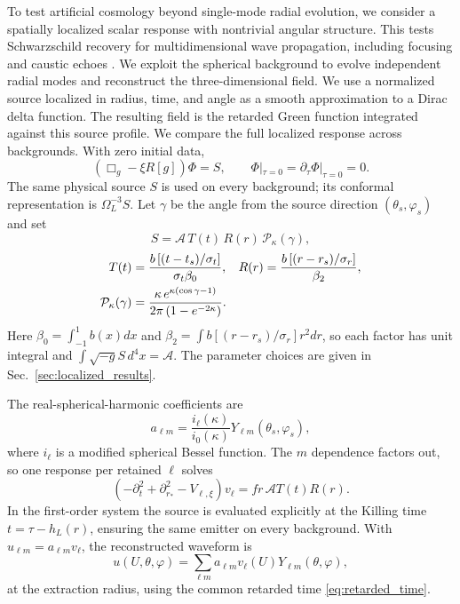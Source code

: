 \documentclass[
 aps,
 prd,
 reprint,
 superscriptaddress,
 nofootinbib,
 longbibliography
]{revtex4-2}
\begin{document}
To test artificial cosmology beyond single-mode radial evolution, we consider
a spatially localized scalar response with nontrivial angular structure.
This tests Schwarzschild recovery for multidimensional wave propagation,
including focusing and caustic echoes
\cite{DolanOttewill:2011,ZenginogluGalley:2012,CasalsNolan:2023}.
We exploit the spherical background to evolve independent radial modes and
reconstruct the three-dimensional field.  We use a normalized source localized
in radius, time, and angle as a smooth approximation to a Dirac delta function.  The resulting field is the retarded Green function integrated
against this source profile.
We compare the full localized response across backgrounds.  With zero initial data,
\begin{equation}
 \left(\Box_g-\xi R[g]\right)\Phi=S,
 \qquad \Phi|_{\tau=0}=\partial_\tau\Phi|_{\tau=0}=0.
 \label{eq:sourced_wave_equation}
\end{equation}
The same physical source $S$ is used on every background; its conformal
representation is $\Omega_L^{-3}S$.  Let $\gamma$ be the angle from the
source direction $(\theta_s,\varphi_s)$ and set
\begin{equation}
 S=\mathcal A\,T(t)\,R(r)\,\mathcal P_\kappa(\gamma),
 \label{eq:source_product}
\end{equation}
\begin{align}
 T(t)&=\frac{b\left[(t-t_s)/\sigma_t\right]}{\sigma_t\beta_0},
 &
 R(r)&=\frac{b\left[(r-r_s)/\sigma_r\right]}{\beta_2},
 \notag\\
 \mathcal P_\kappa(\gamma)&=\frac{\kappa\,e^{\kappa(\cos\gamma-1)}}
 {2\pi\left(1-e^{-2\kappa}\right)}.
 \label{eq:source_angular}
\end{align}
Here $\beta_0=\int_{-1}^{1}b(x)dx$ and
$\beta_2=\int b[(r-r_s)/\sigma_r]r^2dr$, so each factor has unit integral and
$\int\sqrt{-g}S\,d^4x=\mathcal A$. The parameter choices are given in Sec.~\ref{sec:localized_results}.

The real-spherical-harmonic coefficients are
\begin{equation}
 a_{\ell m}=\frac{i_\ell(\kappa)}{i_0(\kappa)}
 Y_{\ell m}(\theta_s,\varphi_s),
 \label{eq:source_modal_amplitudes}
\end{equation}
where $i_\ell$ is a modified spherical Bessel function.  The $m$ dependence
factors out, so one response per retained $\ell$ solves
\begin{equation}
 \left(-\partial_t^2+\partial_{r_*}^2-V_{\ell,\xi}\right)v_\ell
 =f r\,\mathcal A T(t)R(r).
 \label{eq:sourced_radial_equation}
\end{equation}
In the first-order system the source is evaluated explicitly at the Killing
time $t=\tau-h_L(r)$, ensuring the same emitter on every background.  With
$u_{\ell m}=a_{\ell m}v_\ell$, the reconstructed waveform is
\begin{equation}
 u(U,\theta,\varphi)
 =\sum_{\ell m}a_{\ell m}v_\ell(U)Y_{\ell m}(\theta,\varphi),
 \label{eq:angular_reconstruction}
\end{equation}
at the extraction radius, using the common retarded time
\eqref{eq:retarded_time}.
\end{document}
